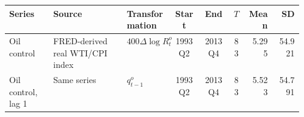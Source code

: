 \begin{tabular}{@{}p{0.15\linewidth}p{0.25\linewidth}p{0.16\linewidth}cccrr@{}}
\toprule
Series & Source & Transformation & Start & End & $T$ & Mean & SD \\
\midrule
Oil control & FRED-derived real WTI/CPI index & $400\Delta\log R_t^o$ & 1993Q2 & 2013Q4 & 83 & 5.295 & 54.921 \\
Oil control, lag 1 & Same series & $q_{t-1}^o$ & 1993Q2 & 2013Q4 & 83 & 5.523 & 54.791 \\
\bottomrule
\end{tabular}
